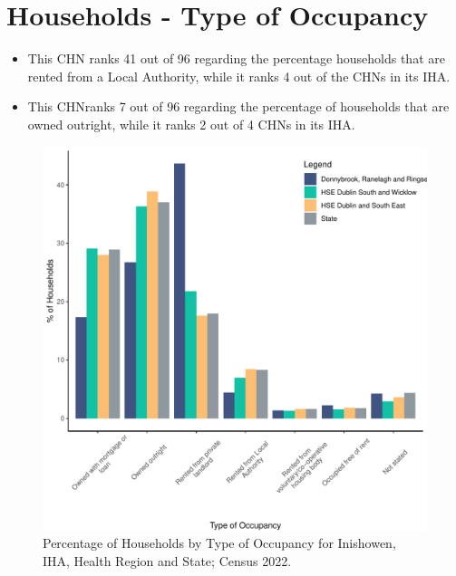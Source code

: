 \documentclass{article}
\begin{document}
\section{Households - Type of Occupancy}\label{sect:Households}
\begin{itemize}
\item This CHN ranks  41 out of 96 regarding the percentage households that are rented from a Local Authority, while it ranks  4 out of the CHNs in its IHA. 
\item This CHNranks  7 out of 96 regarding the percentage of households that are owned outright, while it ranks   2 out of 4 CHNs in its IHA.
\end{itemize}
\begin{figure}[H]
	\centering
	\includegraphics[width = 140mm]{../figures/HouseholdsED.pdf}
	\caption{Percentage of Households by Type of Occupancy for Inishowen, IHA, Health Region and State; Census 2022.}
	\label{fig:vbnv}
	\end{figure}
\end{document}
